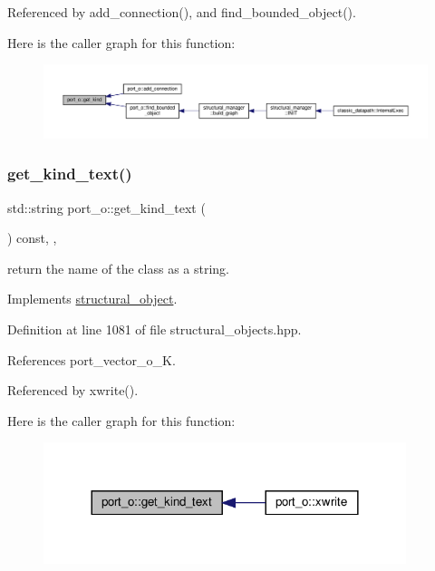 Referenced by add\+\_\+connection(), and find\+\_\+bounded\+\_\+object().

Here is the caller graph for this function\+:
\nopagebreak
\begin{figure}[H]
\begin{center}
\leavevmode
\includegraphics[width=350pt]{df/d75/structport__o_ab52b545359c3b6c24236f5328a49b3c5_icgraph}
\end{center}
\end{figure}
\mbox{\label{structport__o_aa3aee3f5227b20c9a1175ae5875e90bf}} 
\subsubsection{\texorpdfstring{get\+\_\+kind\+\_\+text()}{get\_kind\_text()}}
{\footnotesize\ttfamily std\+::string port\+\_\+o\+::get\+\_\+kind\+\_\+text (\begin{DoxyParamCaption}{ }\end{DoxyParamCaption}) const\hspace{0.3cm}{\ttfamily [inline]}, {\ttfamily [override]}, {\ttfamily [virtual]}}



return the name of the class as a string. 



Implements \hyperlink{classstructural__object_a36c541b52425c4de8fa45d79285a97e7}{structural\+\_\+object}.



Definition at line 1081 of file structural\+\_\+objects.\+hpp.



References port\+\_\+vector\+\_\+o\+\_\+K.



Referenced by xwrite().

Here is the caller graph for this function\+:
\nopagebreak
\begin{figure}[H]
\begin{center}
\leavevmode
\includegraphics[width=300pt]{df/d75/structport__o_aa3aee3f5227b20c9a1175ae5875e90bf_icgraph}
\end{center}
\end{figure}
\mbox{\label{structport__o_a00a38d69b196805ff8d058885deece37}} 
